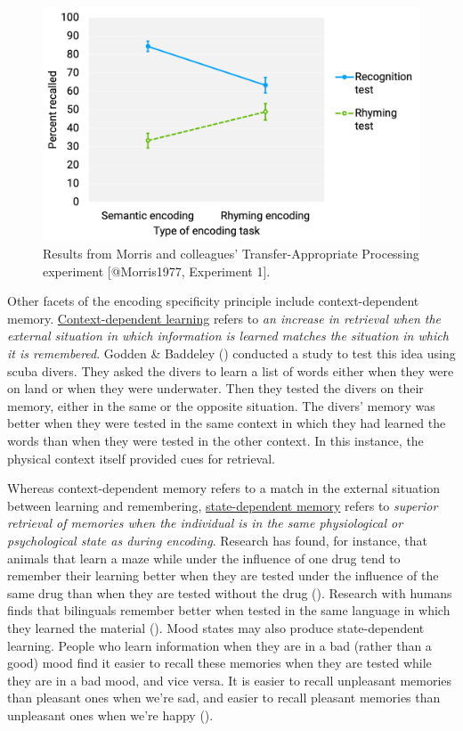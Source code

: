 \documentclass[
]{krantz}
\begin{document}
\begin{figure}

{\centering \includegraphics[width=0.7\linewidth]{images/ch5/fig6} 

}

\caption{Results from Morris and colleagues’ Transfer-Appropriate Processing experiment [@Morris1977, Experiment 1].}\label{fig:morris}
\end{figure}

Other facets of the encoding specificity principle include context-dependent memory. \hyperref[context-dependent-learning]{Context-dependent learning} refers to \emph{an increase in retrieval when the external situation in which information is learned matches the situation in which it is remembered}. Godden \& Baddeley () conducted a study to test this idea using scuba divers. They asked the divers to learn a list of words either when they were on land or when they were underwater. Then they tested the divers on their memory, either in the same or the opposite situation. The divers' memory was better when they were tested in the same context in which they had learned the words than when they were tested in the other context. In this instance, the physical context itself provided cues for retrieval.

Whereas context-dependent memory refers to a match in the external situation between learning and remembering, \hyperref[state-dependent-memory]{state-dependent memory} refers to \emph{superior retrieval of memories when the individual is in the same physiological or psychological state as during encoding}. Research has found, for instance, that animals that learn a maze while under the influence of one drug tend to remember their learning better when they are tested under the influence of the same drug than when they are tested without the drug (). Research with humans finds that bilinguals remember better when tested in the same language in which they learned the material (). Mood states may also produce state-dependent learning. People who learn information when they are in a bad (rather than a good) mood find it easier to recall these memories when they are tested while they are in a bad mood, and vice versa. It is easier to recall unpleasant memories than pleasant ones when we're sad, and easier to recall pleasant memories than unpleasant ones when we're happy ().
\end{document}
